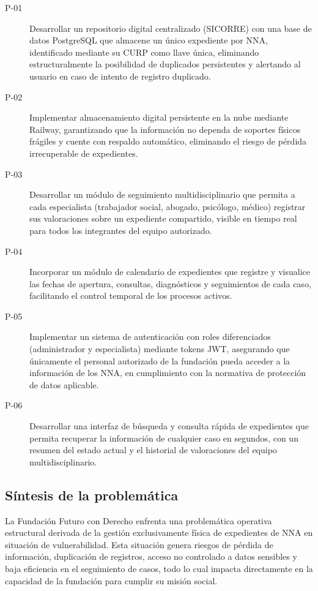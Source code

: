 \begin{description}
	\item[P-01] Desarrollar un repositorio digital centralizado (SICORRE) con una base 
	de datos PostgreSQL que almacene un único expediente por NNA, identificado 
	mediante su CURP como llave única, eliminando estructuralmente la posibilidad de 
	duplicados persistentes y alertando al usuario en caso de intento de registro 
	duplicado.
	
	\item[P-02] Implementar almacenamiento digital persistente en la nube mediante 
	Railway, garantizando que la información no dependa de soportes físicos frágiles y 
	cuente con respaldo automático, eliminando el riesgo de pérdida irrecuperable de 
	expedientes.
	
	\item[P-03] Desarrollar un módulo de seguimiento multidisciplinario que permita a 
	cada especialista (trabajador social, abogado, psicólogo, médico) registrar sus 
	valoraciones sobre un expediente compartido, visible en tiempo real para todos los 
	integrantes del equipo autorizado.
	
	\item[P-04] Incorporar un módulo de calendario de expedientes que registre y 
	visualice las fechas de apertura, consultas, diagnósticos y seguimientos de cada 
	caso, facilitando el control temporal de los procesos activos.
	
	\item[P-05] Implementar un sistema de autenticación con roles diferenciados 
	(administrador y especialista) mediante tokens JWT, asegurando que únicamente 
	el personal autorizado de la fundación pueda acceder a la información de los NNA, 
	en cumplimiento con la normativa de protección de datos aplicable.
	
	\item[P-06] Desarrollar una interfaz de búsqueda y consulta rápida de expedientes 
	que permita recuperar la información de cualquier caso en segundos, con un resumen 
	del estado actual y el historial de valoraciones del equipo multidisciplinario.
\end{description}

\subsection{Síntesis de la problemática}

La Fundación Futuro con Derecho enfrenta una problemática operativa estructural derivada 
de la gestión exclusivamente física de expedientes de NNA en situación de vulnerabilidad. 
Esta situación genera riesgos de pérdida de información, duplicación de registros, 
acceso no controlado a datos sensibles y baja eficiencia en el seguimiento de casos, 
todo lo cual impacta directamente en la capacidad de la fundación para cumplir su misión 
social.


